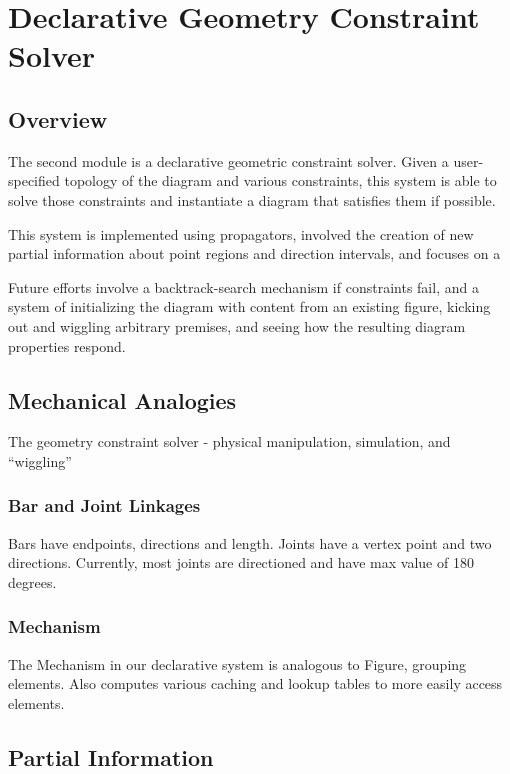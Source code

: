 \chapter{Declarative Geometry Constraint Solver}
\label{chap:declarative}

\section{Overview}

The second module is a declarative geometric constraint solver. Given
a user-specified topology of the diagram and various constraints, this
system is able to solve those constraints and instantiate a diagram
that satisfies them if possible.

This system is implemented using propagators, involved the creation of
new partial information about point regions and direction intervals,
and focuses on a

Future efforts involve a backtrack-search mechanism if constraints
fail, and a system of initializing the diagram with content from an
existing figure, kicking out and wiggling arbitrary premises, and
seeing how the resulting diagram properties respond.

\section{Mechanical Analogies}

The geometry constraint solver - physical manipulation, simulation,
and ``wiggling''

\subsection{Bar and Joint Linkages}

Bars have endpoints, directions and length. Joints have a vertex point
and two directions. Currently, most joints are directioned and have
max value of 180 degrees.

\subsection{Mechanism}

The Mechanism in our declarative system is analogous to Figure,
grouping elements. Also computes various caching and lookup tables to
more easily access elements.

\section{Partial Information}

